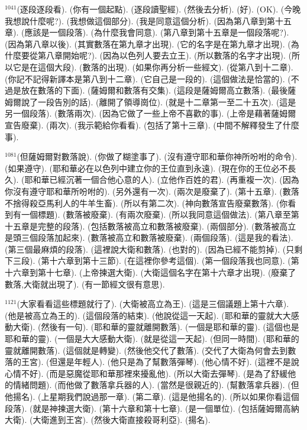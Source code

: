 \documentclass{book}
\begin{document}
$^{1041}$(逐段逐段看).
(你有一個起點).
(逐段讀聖經).
(然後去分析).
(好).
(OK).
(今晚我想說什麼呢?).
(我想做這個部分).
(我是同意這個分析).
(因為第八章到第十五章).
(應該是一個段落).
(為什麼我會同意).
(第八章到第十五章是一個段落呢?).
(因為第八章以後).
(其實數落在第九章才出現).
(它的名字是在第九章才出現).
(為什麼要從第八章開始呢?).
(因為以色列人要去立王).
(所以數落的名字才出現).
(所以它是在這個大段).
(數落的出現).
(如果你再分析一些經文).
(從第八到十二章).
(你記不記得新譯本是第八到十二章).
(它自己是一段的).
(這個做法是恰當的).
(不過是放在數落的下面).
(薩姆爾和數落有交集).
(這段是薩姆爾高立數落).
(最後薩姆爾說了一段告別的話).
(離開了領導崗位).
(就是十二章第一至二十五次).
(這是另一個段落).
(數落兩次).
(因為它做了一些上帝不喜歡的事).
(上帝是藉著薩姆爾宣告廢棄).
(兩次).
(我示範給你看看).
(包括了第十三章).
(中間不解釋發生了什麼事).

$^{1081}$(但薩姆爾對數落說).
(你做了糊塗事了).
(沒有遵守耶和華你神所吩咐的命令).
(如果遵守).
(耶和華必在以色列中建立你的王位直到永遠).
(現在你的王位必不長久).
(耶和華已經沉著一個合他心意的人).
(立他作百姓的君).
(再重複一次).
(因為你沒有遵守耶和華所吩咐的).
(另外還有一次).
(兩次是廢棄了).
(第十五章).
(數落不捨得殺亞馬利人的牛羊生畜).
(所以有第二次).
(神向數落宣告廢棄數落).
(你看到有一個標題).
(數落被廢棄).
(有兩次廢棄).
(所以我同意這個做法).
(第八章至第十五章是完整的段落).
(包括數落被高立和數落被廢棄).
(兩個部分).
(數落被高立是頭三個段落加起來).
(數落被高立和數落被廢棄).
(兩個段落).
(這是我的看法).
(第三個最麻煩的段落).
(這裡說大衛和數落).
(也對的).
(因為已經不能剪掉).
(只剩下三段).
(第十六章到第十三節).
(在這裡你參考這個).
(第一個段落我也同意).
(第十六章到第十七章).
(上帝揀選大衛).
(大衛這個名字在第十六章才出現).
(廢棄了數落,大衛就出現了).
(有一節經文很有意思).

$^{1121}$(大家看看這些標題就行了).
(大衛被高立為王).
(這是三個議題上第十六章).
(他是被高立為王的).
(這個段落的結束).
(他說從這一天起).
(耶和華的靈就大大感動大衛).
(然後有一句).
(耶和華的靈就離開數落).
(一個是耶和華的靈).
(這個也是耶和華的靈).
(一個是大大感動大衛).
(就是從這一天起).
(但同一時間).
(耶和華的靈就離開數落).
(這個就是轉變).
(然後他交代了數落).
(交代了大衛為何會去到數落的王宮).
(但還是年輕人).
(他只是為了幫數落彈琴).
(他心情不好).
(這裡不是說心情不好).
(而是惡魔從耶和華那裡來擾亂他).
(所以大衛去彈琴).
(是為了舒緩他的情緒問題).
(而他做了數落拿兵器的人).
(當然是很親近的).
(幫數落拿兵器).
(但他揚名).
(上星期我們說過那一章).
(第二章).
(這是他揚名的).
(所以如果你看這個段落).
(就是神揀選大衛).
(第十六章和第十七章).
(是一個單位).
(包括薩姆爾高納大衛).
(大衛進到王宮).
(然後大衛直接殺哥利亞).
(揚名).
\end{document}
